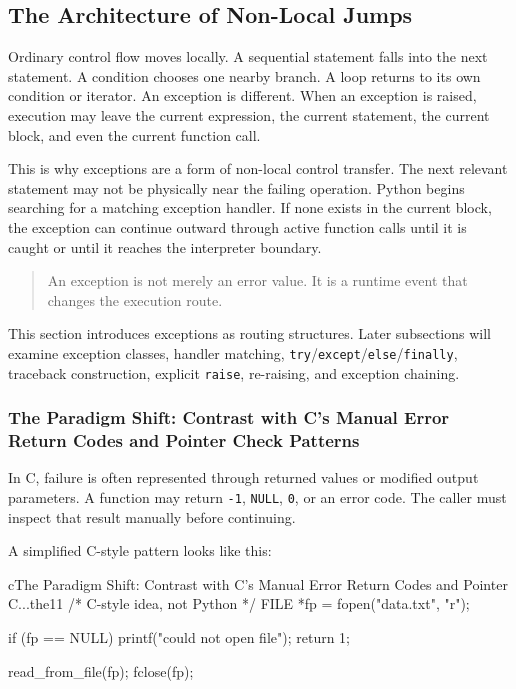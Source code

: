 \subsection{The Architecture of Non-Local Jumps}

Ordinary control flow moves locally. A sequential statement falls into the next statement. A condition chooses one nearby branch. A loop returns to its own condition or iterator. An exception is different. When an exception is raised, execution may leave the current expression, the current statement, the current block, and even the current function call.

This is why exceptions are a form of non-local control transfer. The next relevant statement may not be physically near the failing operation. Python begins searching for a matching exception handler. If none exists in the current block, the exception can continue outward through active function calls until it is caught or until it reaches the interpreter boundary.

\begin{quote}
An exception is not merely an error value. It is a runtime event that changes the execution route.
\end{quote}

This section introduces exceptions as routing structures. Later subsections will examine exception classes, handler matching, \texttt{try}/\texttt{except}/\texttt{else}/\texttt{finally}, traceback construction, explicit \texttt{raise}, re-raising, and exception chaining.

\subsubsection{The Paradigm Shift: Contrast with C's Manual Error Return Codes and Pointer Check Patterns}

In C, failure is often represented through returned values or modified output parameters. A function may return \texttt{-1}, \texttt{NULL}, \texttt{0}, or an error code. The caller must inspect that result manually before continuing.

A simplified C-style pattern looks like this:

\begin{codebox}[]{c}{The Paradigm Shift: Contrast with C's Manual Error Return Codes and Pointer C...}{the11}
/* C-style idea, not Python */
FILE *fp = fopen("data.txt", "r");

if (fp == NULL) {
    printf("could not open file\n");
    return 1;
}

read_from_file(fp);
fclose(fp);
\end{codebox}


